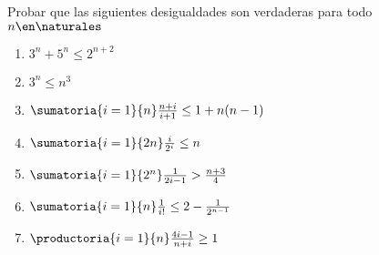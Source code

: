 \begin{enunciado}{\ejercicio}
  Probar que las siguientes desigualdades son verdaderas para todo $n \en \naturales$
  \begin{multicols}{2}
    \begin{enumerate}[label=\roman*)]
      \item $3^n + 5^n \leq 2^{n+2}$
      \item $3^n \leq n^3$
      \item $ \sumatoria{i=1}{n} \frac{n+i}{i+1} \leq 1 + n(n-1)$
      \item $ \sumatoria{i=1}{2n} \frac{i}{2^i} \leq n$
      \item $ \sumatoria{i=1}{2^n} \frac{1}{2i-1} > \frac{n+3}{4}$
      \item $ \sumatoria{i=1}{n} \frac{1}{i!} \leq 2 - \frac{1}{2^{n-1}}$
      \item $ \productoria{i=1}{n} \frac{4i-1}{n+i} \geq 1$
    \end{enumerate}
  \end{multicols}
\end{enunciado}

